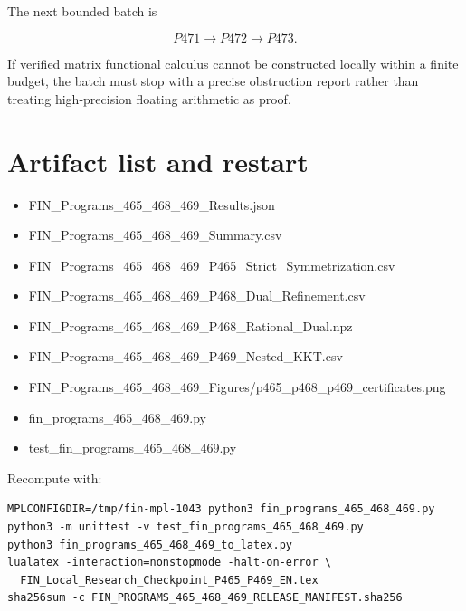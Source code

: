 \documentclass[11pt,a4paper,openany]{report}
\begin{document}
The next bounded batch is

\[
\boxed{P471\longrightarrow P472\longrightarrow P473}.
\]

If verified matrix functional calculus cannot be constructed locally within a finite budget, the batch must stop with a precise obstruction report rather than treating high-precision floating arithmetic as proof.

\chapter{Artifact list and restart}

\begin{itemize}
\item 
FIN\_Programs\_465\_468\_469\_Results.json

\item 
FIN\_Programs\_465\_468\_469\_Summary.csv

\item 
FIN\_Programs\_465\_468\_469\_P465\_Strict\_Symmetrization.csv

\item 
FIN\_Programs\_465\_468\_469\_P468\_Dual\_Refinement.csv

\item 
FIN\_Programs\_465\_468\_469\_P468\_Rational\_Dual.npz

\item 
FIN\_Programs\_465\_468\_469\_P469\_Nested\_KKT.csv

\item 
FIN\_Programs\_465\_468\_469\_Figures/\allowbreak{}p465\_p468\_p469\_certificates.png

\item 
fin\_programs\_465\_468\_469.py

\item 
test\_fin\_programs\_465\_468\_469.py

\end{itemize}

Recompute with:

\begin{Verbatim}[fontsize=\small]
MPLCONFIGDIR=/tmp/fin-mpl-1043 python3 fin_programs_465_468_469.py
python3 -m unittest -v test_fin_programs_465_468_469.py
python3 fin_programs_465_468_469_to_latex.py
lualatex -interaction=nonstopmode -halt-on-error \
  FIN_Local_Research_Checkpoint_P465_P469_EN.tex
sha256sum -c FIN_PROGRAMS_465_468_469_RELEASE_MANIFEST.sha256
\end{Verbatim}
\end{document}
